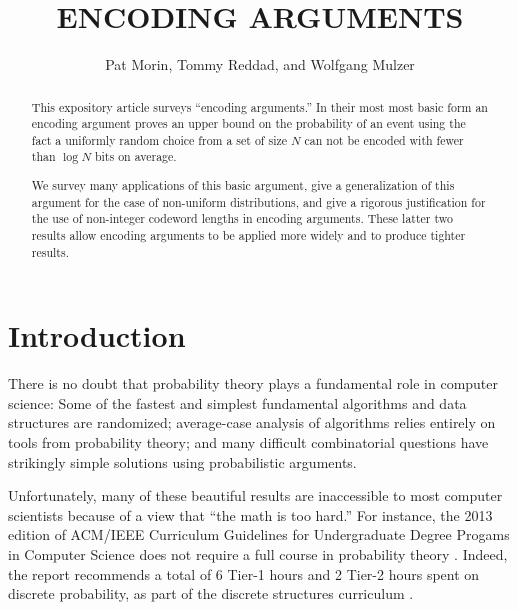 \documentclass{patmorin}
\title{\MakeUppercase{Encoding Arguments}}
\author{Pat Morin, Tommy Reddad, and Wolfgang Mulzer}
\date{}
\begin{document}
\begin{titlepage}
\maketitle


\begin{abstract}
\setlength{\baselineskip}{15.84pt}
This expository article surveys ``encoding arguments.'' In their most most
basic form an encoding argument proves an upper bound on the probability
of an event using the fact a uniformly random choice from a set of size
$N$ can not be encoded with fewer than $\log N$ bits on average.

We survey many applications of this basic argument, give a generalization
of this argument for the case of non-uniform distributions, and give a
rigorous justification for the use of non-integer codeword lengths in
encoding arguments.  These latter two results allow encoding arguments to be applied more widely and to produce tighter results.
\end{abstract}


\end{titlepage}
\tableofcontents
\newpage
{}

\section{Introduction}
\setlength{\baselineskip}{15.84pt}
There is no doubt that probability theory plays a fundamental role
in computer science: Some of the fastest and simplest fundamental
algorithms and data structures are randomized; average-case analysis of
algorithms relies entirely on tools from probability theory; and many
difficult combinatorial questions have strikingly simple solutions using
probabilistic arguments.

Unfortunately, many of these beautiful results are inaccessible
to most computer scientists because of a view that ``the math
is too hard.''  For instance, the 2013 edition of ACM/IEEE
Curriculum Guidelines for Undergraduate Degree Progams in Computer
Science does not require a full course in probability theory
\cite[Page~50]{computing-curricula:computer}. Indeed, the report
recommends a total of 6 Tier-1 hours and 2 Tier-2 hours spent on
discrete probability, as part of the discrete structures curriculum
\cite[Page~77]{computing-curricula:computer}.
\end{document}
